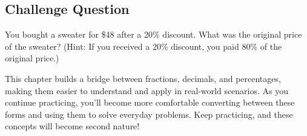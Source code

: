 \subsection{Challenge Question}
You bought a sweater for \$48 after a 20\% discount. What was the original price of the sweater? (Hint: If you received a 20\% discount, you paid 80\% of the original price.)

This chapter builds a bridge between fractions, decimals, and percentages, making them easier to understand and apply in real-world scenarios. As you continue practicing, you'll become more comfortable converting between these forms and using them to solve everyday problems. Keep practicing, and these concepts will become second nature!